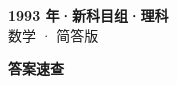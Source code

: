 \documentclass[zihao=-4, a4paper]{ctexart}
\begin{document}
\begin{center}
  {\Large\bfseries 1993 年·新科目组·理科}\\[4pt]
  {\large 数学 · 简答版}
\end{center}
\medskip
{}

\clearpage
{}
\begin{center}{\Large\bfseries 答案速查}\end{center}
\medskip

\end{document}

